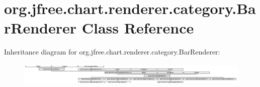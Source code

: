 \hypertarget{classorg_1_1jfree_1_1chart_1_1renderer_1_1category_1_1_bar_renderer}{}\section{org.\+jfree.\+chart.\+renderer.\+category.\+Bar\+Renderer Class Reference}
\label{classorg_1_1jfree_1_1chart_1_1renderer_1_1category_1_1_bar_renderer}
Inheritance diagram for org.\+jfree.\+chart.\+renderer.\+category.\+Bar\+Renderer\+:\begin{figure}[H]
\begin{center}
\leavevmode
\includegraphics[height=1.082474cm]{classorg_1_1jfree_1_1chart_1_1renderer_1_1category_1_1_bar_renderer}
\end{center}
\end{figure}
